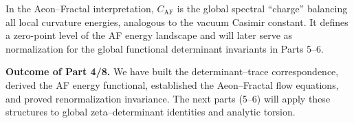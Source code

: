 \begin{remark}\label{rem:phys}
In the Aeon–Fractal interpretation, $C_{\mathrm{AF}}$ is the global
spectral “charge” balancing all local curvature energies, analogous to
the vacuum Casimir constant. It defines a zero-point level of the AF
energy landscape and will later serve as normalization for the global
functional determinant invariants in Parts 5–6.                        %
\end{remark}


\noindent\textbf{Outcome of Part 4/8.}
We have built the determinant–trace correspondence, derived the AF
energy functional, established the Aeon–Fractal flow equations, and
proved renormalization invariance. The next parts (5–6) will apply these
structures to global zeta–determinant identities and analytic torsion.   %



